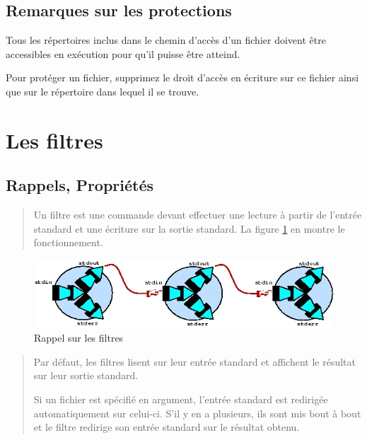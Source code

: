 \subsection{Remarques sur les protections}

Tous les r{\'e}pertoires inclus dans le chemin d'acc{\`e}s d'un fichier doivent
{\^e}tre accessibles en ex{\'e}cution pour qu'il  puisse {\^e}tre atteind.

Pour prot{\'e}ger un fichier, supprimez le droit d'acc{\`e}s en {\'e}criture sur ce
fichier ainsi que sur le r{\'e}pertoire dans lequel il se trouve.

\section{Les filtres}

\subsection{Rappels, Propri{\'e}t{\'e}s}

\begin{quote}
Un filtre est une commande devant effectuer une lecture {\`a} partir de
l'entr{\'e}e standard et une {\'e}criture sur la sortie standard. La figure
\ref{fig-cmds-rapp-filter} en montre le fonctionnement.
\end{quote}

\begin{figure}[hbtp]
\centering
\includegraphics{./_Images/cmds-unix/rapp-filter.jpg}
\caption{\label{fig-cmds-rapp-filter}Rappel sur les filtres}
\end{figure}

\begin{quote}
Par d{\'e}faut, les filtres lisent sur leur entr{\'e}e standard et affichent le
r{\'e}sultat sur leur sortie standard.

Si un fichier est sp{\'e}cifi{\'e} en argument, l'entr{\'e}e standard est redirig{\'e}e
automatiquement sur celui-ci. S'il y en a plusieurs, ils sont mis bout {\`a}
bout et le filtre redirige son entr{\'e}e standard sur le r{\'e}sultat obtenu.
\end{quote}

